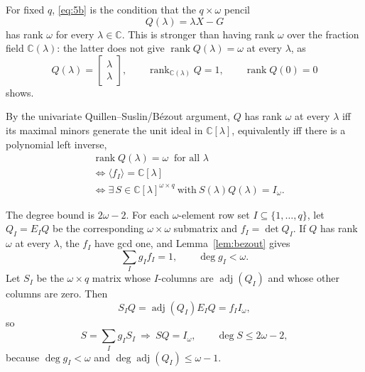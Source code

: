 \documentclass[journal]{IEEEtran}
\theoremstyle{plainn}
\theoremstyle{remark}
\begin{document}
For fixed $q$, \eqref{eq:5b} is the condition that the $q\times\omega$ pencil
\begin{equation}
Q(\lambda)=\lambda X-G
\end{equation}
has rank $\omega$ for every $\lambda\in\mathbb C$. This is stronger than having rank $\omega$ over the fraction field $\mathbb C(\lambda)$: the latter does not give $\operatorname{rank}Q(\lambda)=\omega$ at every $\lambda$, as
\begin{equation*}
Q(\lambda)=\begin{bmatrix}\lambda\\ \lambda\end{bmatrix},\qquad
\operatorname{rank}_{\mathbb C(\lambda)}Q=1,\qquad \operatorname{rank}Q(0)=0
\end{equation*}
shows.

By the univariate Quillen--Suslin/B\'ezout argument, $Q$ has rank $\omega$ at every $\lambda$ iff its maximal minors generate the unit ideal in $\mathbb C[\lambda]$, equivalently iff there is a polynomial left inverse,
\begin{equation*}
\begin{aligned}
&\operatorname{rank}Q(\lambda)=\omega\ \text{ for all }\lambda\\
&\iff\langle f_I\rangle=\mathbb C[\lambda]\\
&\iff\exists\,S\in\mathbb C[\lambda]^{\omega\times q}\ \text{with}\ S(\lambda)Q(\lambda)=I_\omega .
\end{aligned}
\end{equation*}

The degree bound is $2\omega-2$. For each $\omega$-element row set $I\subseteq\{1,\dots,q\}$, let $Q_I=E_IQ$ be the corresponding $\omega\times\omega$ submatrix and $f_I=\det Q_I$. If $Q$ has rank $\omega$ at every $\lambda$, the $f_I$ have gcd one, and Lemma~\ref{lem:bezout} gives
\begin{equation}
\sum_I g_I f_I=1,\qquad \deg g_I<\omega .
\end{equation}
Let $S_I$ be the $\omega\times q$ matrix whose $I$-columns are $\operatorname{adj}(Q_I)$ and whose other columns are zero. Then
\begin{equation*}
S_IQ=\operatorname{adj}(Q_I)E_IQ=f_II_\omega,
\end{equation*}
so
\begin{equation*}
S=\sum_I g_I S_I\ \Longrightarrow\ SQ=I_\omega,\qquad
\deg S\le2\omega-2,
\end{equation*}
because $\deg g_I<\omega$ and $\deg\operatorname{adj}(Q_I)\le\omega-1$.
\end{document}
